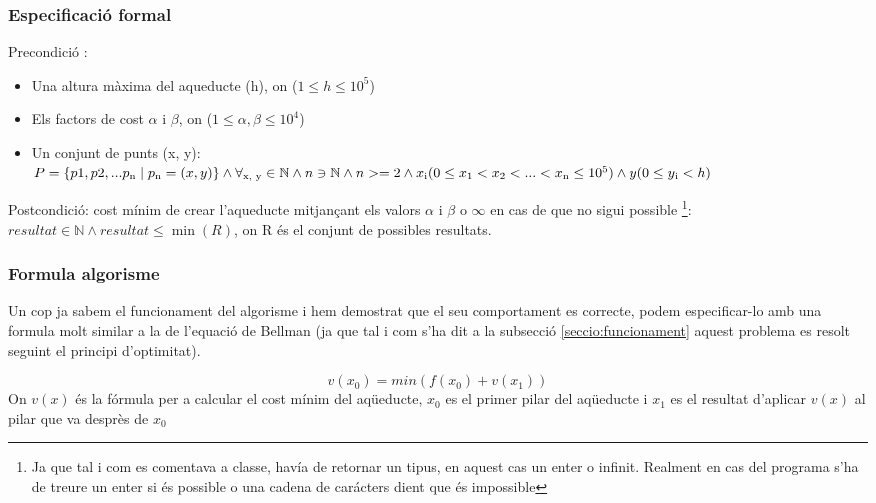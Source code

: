 \documentclass[12pt, letterpaper]{article}
\begin{document}
\subsubsection{Especificació formal}
Precondició :
\begin{itemize}
    \item Una altura màxima del aqueducte (h), on ($1 \leq h \leq 10^5$)
    \item Els factors de cost $\alpha$ i $\beta$, on ($1\leq \alpha, \beta \leq 10^4$)
    \item Un conjunt de punts (x, y):\\
        $P = \{p1, p2, ... p\textsubscript{n} \mid p\textsubscript{n} = (x, y) \} \land \forall \textsubscript{x, y} \in \mathbb{N} \land n \owns \mathbb{N} \land n >= 2 
        \land x\textsubscript{i} (0\leq x\textsubscript{1} < x\textsubscript{2} < ... < x\textsubscript{n} \leq 10^5) \land y (0 \leq y\textsubscript{i} < h) $

\end{itemize}
Postcondició: cost mínim de crear l'aqueducte mitjançant els valors $\alpha$ i $\beta$ o $\infty$ en cas de que no sigui possible \footnote{Ja que tal i com es comentava a classe, havía de retornar un tipus, en aquest cas un enter o infinit. Realment en cas del programa s'ha de treure un enter si és possible o una cadena de carácters dient que és impossible}:\\

        $ resultat \in \mathbb{N} \land resultat \leq \min(R) $, on R és el conjunt de possibles resultats.


 
\subsubsection{Formula algorisme}
Un cop ja sabem el funcionament del algorisme i hem demostrat que el seu comportament es correcte, podem especificar-lo amb una formula molt similar a la de l'equació de Bellman (ja que tal i com s'ha dit a la subsecció \ref{seccio:funcionament} aquest problema es resolt seguint el principi d'optimitat).

\begin{center}
\begin{equation}
v(x_{0}) = min(f(x_{0}) + v(x_{1}))
\end{equation}
On $v(x)$ és la fórmula per a calcular el cost mínim del aqüeducte, $x_{0}$ es el primer pilar del aqüeducte i $x_{1}$ es el resultat d'aplicar $v(x)$ al pilar que va desprès de $x_{0}$
\end{center}
\end{document}
